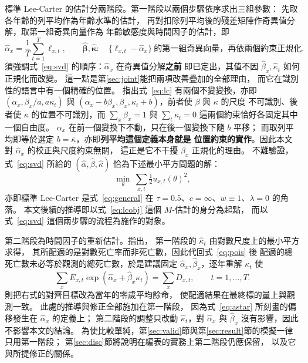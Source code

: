 \documentclass[UTF8, fontset=macnew, a4paper, 12pt]{ctexart}
\begin{document}
標準 Lee-Carter 的估計分兩階段。第一階段以兩個步驟依序求出三組參數：
先取各年齡的列平均作為年齡水準的估計，
再對扣除列平均後的殘差矩陣作奇異值分解，取第一組奇異向量作為
年齡敏感度與時間因子的估計，即
\begin{equation}\label{eq:svd}
\hat\alpha_x=\frac1T\sum_{t=1}^{T}\ell_{x,t},\qquad
\hat{\boldsymbol\beta},\hat{\boldsymbol\kappa}:\quad
\{\ell_{x,t}-\hat\alpha_x\}\ \text{的第一組奇異向量，再依兩個約束正規化} .
\end{equation}
須強調式~\eqref{eq:svd} 的順序：$\hat\alpha_x$ 在奇異值分解\textbf{之前}
即已定出，其值不因 $\hat\beta_x,\hat\kappa_t$ 如何正規化而改變。
這一點是第\ref{sec:joint}能把兩項改善疊加的全部理由，
而它在識別性的語言中有一個精確的位置。\citet{hunt2020} 指出式~\eqref{eq:lc}
有兩個不變變換，亦即 $(\alpha_x,\beta_x/a,a\kappa_t)$ 與
$(\alpha_x-b\beta_x,\beta_x,\kappa_t+b)$，前者使 $\beta$ 與 $\kappa$ 的尺度
不可識別、後者使 $\kappa$ 的位置不可識別，而 $\sum_x\beta_x=1$ 與
$\sum_t\kappa_t=0$ 這兩個約束恰好各固定其中一個自由度。
$\alpha_x$ 在前一個變換下不動，只在後一個變換下隨 $b$ 平移；
而取列平均即等於選定 $b=\bar\kappa$，亦即\textbf{列平均這個定義本身就是
位置約束的實作}。因此本文對 $\hat\alpha_x$ 的校正與尺度約束無關，
這正是它不干擾 $\hat\beta_x$ 正規化的理由。
不難驗證，式~\eqref{eq:svd} 所給的 $(\hat\alpha,\hat\beta,\hat\kappa)$
恰為下述最小平方問題的解：
\begin{equation}\label{eq:lcobj}
\min_{\theta}\ \sum_{x,t}\tfrac12 u_{x,t}(\theta)^2 ,
\end{equation}
亦即標準 Lee-Carter 是式~\eqref{eq:general} 在
$\tau=0.5$、$c=\infty$、$w\equiv1$、$\lambda=0$ 的角落。
本文後續的推導即以式~\eqref{eq:lcobj} 這個 $M$-估計的身分為起點，
而以式~\eqref{eq:svd} 這個兩步驟的流程為施作的對象。

第二階段為時間因子的重新估計。\citet{lee1992}指出，
第一階段的 $\hat\kappa_t$ 由對數尺度上的最小平方求得，
其所配適的是對數死亡率而非死亡數，因此代回式~\eqref{eq:pois} 後
配適的總死亡數未必等於觀測的總死亡數，於是建議固定
$\hat\alpha_x,\hat\beta_x$，逐年重解 $\kappa_t$ 使
\begin{equation}\label{eq:stage2}
\sum_{x}E_{x,t}\exp(\hat\alpha_x+\hat\beta_x\kappa_t)=\sum_x D_{x,t},
\qquad t=1,\dots,T .
\end{equation}
\citet{leemiller2001}則把右式的對齊目標改為當年的零歲平均餘命，
使配適結果在最終標的量上與觀測一致。
此處的推導與修正全部施加在第一階段，
因為式~\eqref{eq:astar} 所刻畫的偏移發生在 $\hat\alpha_x$ 的定義上；
第二階段的調整只改動 $\hat\kappa_t$，對 $\hat\alpha_x$ 與 $\hat\beta_x$
沒有影響，因此不影響本文的結論。
為使比較單純，第\ref{sec:valid}節與第\ref{sec:result}節的模擬一律只用第一階段；
第\ref{sec:disc}節將說明在編表的實務上第二階段仍應保留，
以及它與所提修正的關係。
\end{document}
